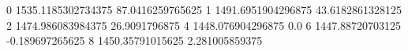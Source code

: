 0 1535.1185302734375 87.0416259765625
1 1491.6951904296875 43.6182861328125
2 1474.986083984375 26.9091796875
4 1448.076904296875 0.0
6 1447.88720703125 -0.189697265625
8 1450.35791015625 2.281005859375
